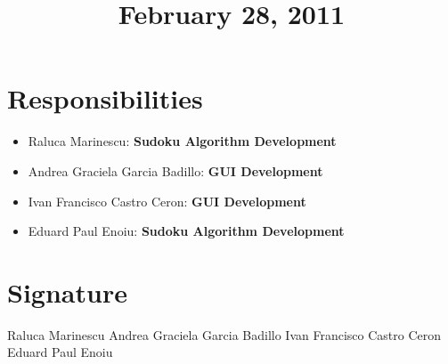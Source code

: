 \documentclass[12pt,a4paper]{article} %
\begin{document}
\section{Responsibilities}
 \begin{itemize}
\item Raluca Marinescu: \textbf{Sudoku Algorithm Development}
\item Andrea Graciela Garcia Badillo: \textbf{GUI Development}
\item Ivan Francisco Castro Ceron: \textbf{GUI Development}
\item Eduard Paul Enoiu: \textbf{Sudoku Algorithm Development}
\end{itemize}
\section{Signature}
\mbox{}
\newline
\mbox{}
\newline
Raluca Marinescu \hrulefill
\mbox{}
\newline
\mbox{}
\newline
\mbox{}
\newline
\mbox{}
\newline
Andrea Graciela Garcia Badillo \hrulefill
\mbox{}
\newline
\mbox{}
\newline
\mbox{}
\newline
\mbox{}
\newline
Ivan Francisco Castro Ceron \hrulefill
\mbox{}
\newline
\mbox{}
\newline
\mbox{}
\newline
\mbox{}
\newline
Eduard Paul Enoiu  \hrulefill
\newpage

\title{February 28, 2011}
\end{document}
